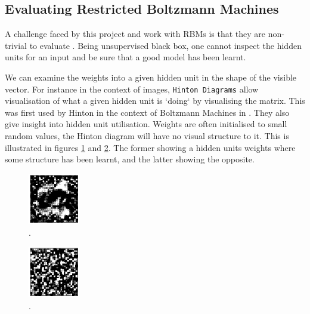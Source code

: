     \subsection{Evaluating Restricted Boltzmann Machines}
    A challenge faced by this project and work with RBMs is that they are non-trivial to evaluate . Being unsupervised black box, one cannot inspect the hidden units for an input and be sure that a good model has been learnt.

    We can examine the weights into a given hidden unit in the shape of the visible vector. For instance in the context of images, \texttt{Hinton Diagrams} allow visualisation of what a given hidden unit is `doing` by visualising the matrix. This was first used by Hinton in the context of Boltzmann Machines in \cite{Hinton:1986:LRB:104279.104291}. They also give insight into hidden unit utilisation.  Weights are often initialised to small random values, the Hinton diagram will have no visual structure to it. This is illustrated in figures \ref{F:Hinton-Good} and \ref{F:Hinton-Bad}. The former showing a hidden units weights where some structure has been learnt, and the latter showing the opposite.

    \begin{figure}
    \begin{center}
      \includegraphics[width = 0.2\textwidth]{Assets/HINTON1.png}
    \caption{.}
    \label{F:Hinton-Good}
    \end{center}
    \end{figure}
    \begin{figure}
    \begin{center}
      \includegraphics[width = 0.2\textwidth]{Assets/HINTON2.png}
    \caption{.}
    \label{F:Hinton-Bad}
    \end{center}
    \end{figure}

